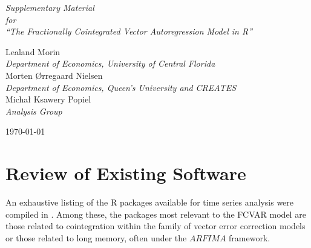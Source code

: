 \documentclass[11pt,letterpaper]{paper}
\let\proglang=\textsf
\begin{document}
\vspace{2.0in}


\begin{centering}

{\huge \it
Supplementary Material  \\
for \\
``The Fractionally Cointegrated Vector Autoregression Model in \proglang{R}'' \\
}

\vspace{1.0in}


{\large 
Lealand Morin \\
{\it Department of Economics, University of Central Florida} \\
\medskip
Morten \O rregaard Nielsen\\
{\it Department of Economics, Queen's University and CREATES} \\
\medskip
Micha\l{} Ksawery Popiel\\
{\it Analysis Group} \\
}

\vspace{0.5in}


\today

\end{centering}

\vspace{0.5in}


\section{Review of Existing Software}

% 
An exhaustive listing of the R packages \citep{R} available for time series analysis were compiled in 
\citet{Hyndman2020}.
% 
Among these, the packages most relevant to the FCVAR model are those related to cointegration within the family of vector error correction models or those related to long memory, often under the $ARFIMA$ framework. 

\end{document}
